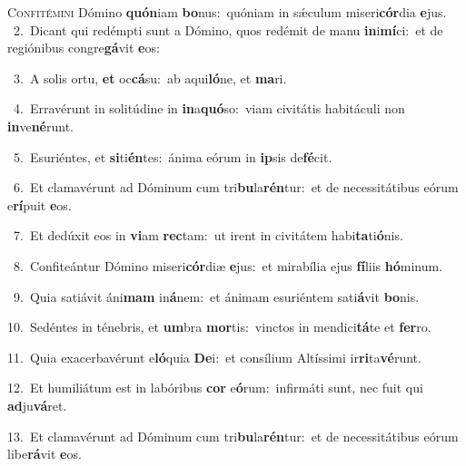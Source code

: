 \lettrine{\initial\textcolor{\initialcolor}{C}}{onfitémini} Dómino \textbf{quón}\-iam \textbf{bo}\-nus:~\star quóniam in sǽculum miseri\-\textbf{cór}\-dia \textbf{e}\-jus.\\
{\numbfont\textcolor{\numbcolor}{~2.}}~Dicant qui redémpti sunt a Dómino, quos redémit de manu \textbf{in}\-i\-\textbf{mí}\-ci:~\star et de regiónibus congre\-\textbf{gá}\-vit \textbf{e}\-os:\par
{\numbfont\textcolor{\numbcolor}{~3.}}~A solis ortu, \textbf{et} oc\-\textbf{cá}\-su:~\star ab aqui\-\textbf{ló}\-ne, et \textbf{ma}\-ri.\par
{\numbfont\textcolor{\numbcolor}{~4.}}~Erravérunt in solitúdine in \textbf{in}\-a\-\textbf{quó}\-so:~\star viam civitátis habitáculi non \textbf{in}\-ve\-\textbf{né}\-runt.\par
{\numbfont\textcolor{\numbcolor}{~5.}}~Esuriéntes, et \textbf{si}\-ti\-\textbf{én}\-tes:~\star ánima eórum in \textbf{ip}\-sis de\-\textbf{fé}\-cit.\par
{\numbfont\textcolor{\numbcolor}{~6.}}~Et clamavérunt ad Dóminum cum tri\-\textbf{bu}\-la\-\textbf{rén}\-tur:~\star et de necessitátibus eórum e\-\textbf{rí}\-puit \textbf{e}\-os.\par
{\numbfont\textcolor{\numbcolor}{~7.}}~Et dedúxit eos in \textbf{vi}\-am \textbf{rec}\-tam:~\star ut irent in civitátem habi\-\textbf{ta}\-ti\-\textbf{ó}\-nis.\par
{\numbfont\textcolor{\numbcolor}{~8.}}~Confiteántur Dómino miseri\-\textbf{cór}\-diæ \textbf{e}\-jus:~\star et mirabília ejus \textbf{fí}\-liis \textbf{hó}\-minum.\par
{\numbfont\textcolor{\numbcolor}{~9.}}~Quia satiávit áni\textbf{mam} in\-\textbf{á}\-nem:~\star et ánimam esuriéntem sati\-\textbf{á}\-vit \textbf{bo}\-nis.\par
{\numbfont\textcolor{\numbcolor}{10.}}~Sedéntes in ténebris, et \textbf{um}\-bra \textbf{mor}\-tis:~\star vinctos in mendici\-\textbf{tá}\-te et \textbf{fer}\-ro.\par
{\numbfont\textcolor{\numbcolor}{11.}}~Quia exacerbavérunt e\-\textbf{ló}\-quia \textbf{De}\-i:~\star et consílium Altíssimi ir\-\textbf{ri}\-ta\-\textbf{vé}\-runt.\par
{\numbfont\textcolor{\numbcolor}{12.}}~Et humiliátum est in labóribus \textbf{cor} e\-\textbf{ó}\-rum:~\star infirmáti sunt, nec fuit qui \textbf{ad}\-ju\-\textbf{vá}\-ret.\par
{\numbfont\textcolor{\numbcolor}{13.}}~Et clamavérunt ad Dóminum cum tri\-\textbf{bu}\-la\-\textbf{rén}\-tur:~\star et de necessitátibus eórum libe\-\textbf{rá}\-vit \textbf{e}\-os.\par

